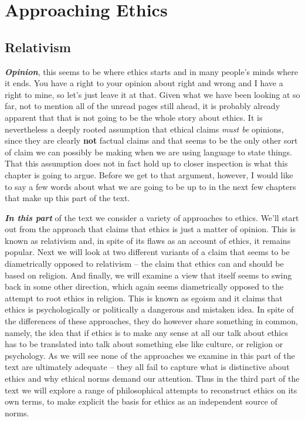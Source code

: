 \documentclass[]{book}
\begin{document}
\hypertarget{part-approaching-ethics}{%
\part*{Approaching Ethics}\label{part-approaching-ethics}}


\hypertarget{relativism}{%
\chapter{Relativism}\label{relativism}}

\textbf{\emph{Opinion}}, this seems to be where ethics starts and in many people's minds where it ends. You have a right to your opinion about right and wrong and I have a right to mine, so let's just leave it at that. Given what we have been looking at so far, not to mention all of the unread pages still ahead, it is probably already apparent that that is not going to be the whole story about ethics. It is nevertheless a deeply rooted assumption that ethical claims \emph{must be} opinions, since they are clearly \textbf{not} factual claims and that seems to be the only other sort of claim we can possibly be making when we are using language to state things. That this assumption does not in fact hold up to closer inspection is what this chapter is going to argue. Before we get to that argument, however, I would like to say a few words about what we are going to be up to in the next few chapters that make up this part of the text.

\textbf{\emph{In this part}} of the text we consider a variety of approaches to ethics. We'll start out from the approach that claims that ethics is just a matter of opinion. This is known as relativism and, in spite of its flaws as an account of ethics, it remains popular. Next we will look at two different variants of a claim that seems to be diametrically opposed to relativism -- the claim that ethics can and should be based on religion. And finally, we will examine a view that itself seems to swing back in some other direction, which again seems diametrically opposed to the attempt to root ethics in religion. This is known as egoism and it claims that ethics is psychologically or politically a dangerous and mistaken idea. In spite of the differences of these approaches, they do however share something in common, namely, the idea that if ethics is to make any sense at all our talk about ethics has to be translated into talk about something else like culture, or religion or psychology. As we will see none of the approaches we examine in this part of the text are ultimately adequate -- they all fail to capture what is distinctive about ethics and why ethical norms demand our attention. Thus in the third part of the text we will explore a range of philosophical attempts to reconstruct ethics on its own terms, to make explicit the basis for ethics as an independent source of norms.
\end{document}
